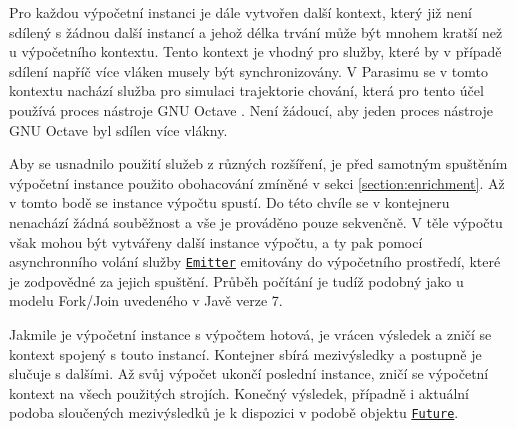 Pro každou výpočetní instanci je dále vytvořen další kontext, který již není sdílený
s žádnou další instancí a jehož délka trvání může být  mnohem kratší než u výpočetního kontextu.
Tento kontext je vhodný pro služby, které by v případě sdílení napříč více vláken musely
být synchronizovány. V Parasimu se v tomto kontextu nachází služba pro simulaci trajektorie
chování, která pro tento účel používá proces nástroje GNU Octave \cite{eaton2008}. Není
žádoucí, aby jeden proces nástroje GNU Octave byl sdílen více vlákny. 

Aby se usnadnilo použití služeb z různých rozšíření, je před samotným spuštěním výpočetní
instance použito obohacování zmíněné v sekci \ref{section:enrichment}. Až v tomto bodě
se instance výpočtu spustí. Do této chvíle se v kontejneru nenachází žádná souběžnost
a vše je prováděno pouze sekvenčně. V těle výpočtu však mohou být vytvářeny další instance výpočtu,
a ty pak pomocí asynchronního volání služby \href{https://github.com/sybila/parasim/blob/master/extensions/computation-lifecycle-api/src/main/java/org/sybila/parasim/computation/lifecycle/api/Emitter.java}{\texttt{Emitter}} emitovány do výpočetního prostředí, které je zodpovědné za jejich spuštění.
Průběh počítání je tudíž podobný jako u modelu Fork/Join \cite{lea2000} uvedeného v Javě verze 7.

Jakmile je výpočetní instance s výpočtem hotová, je vrácen výsledek a zničí se
kontext spojený s touto instancí. Kontejner sbírá mezivýsledky a postupně je slučuje
s dalšími. Až svůj výpočet ukončí poslední instance, zničí se výpočetní kontext na
všech použitých strojích. Konečný výsledek, případně i aktuální podoba sloučených
mezivýsledků je k dispozici v podobě objektu \href{https://github.com/sybila/parasim/blob/master/extensions/computation-lifecycle-api/src/main/java/org/sybila/parasim/computation/lifecycle/api/Future.java}{\texttt{Future}}.

